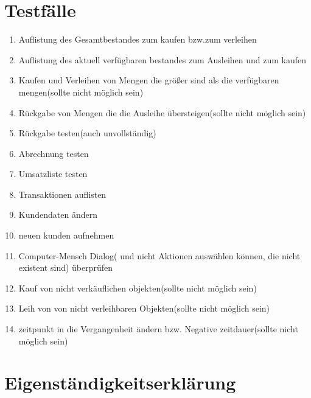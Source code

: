 \documentclass[a4paper,12pt]{book}
\begin{document}
\part{Testfälle}
\begin{enumerate}
\item
Auflistung des Gesamtbestandes zum kaufen bzw.zum verleihen 
\item
Auflistung des aktuell verfügbaren bestandes zum Ausleihen und zum kaufen
\item
Kaufen und Verleihen von Mengen die größer sind als die verfügbaren mengen(sollte nicht möglich sein)
\item
Rückgabe von Mengen die die Ausleihe übersteigen(sollte nicht möglich sein)
\item
Rückgabe testen(auch unvollständig)
\item
Abrechnung testen
\item
Umsatzliste testen
\item
Transaktionen auflisten
\item
Kundendaten ändern 
\item
neuen kunden aufnehmen
\item
Computer-Mensch Dialog( und nicht Aktionen auswählen können, die nicht existent sind) überprüfen
\item
Kauf von nicht verkäuflichen objekten(sollte nicht möglich sein)
\item
Leih von von nicht verleihbaren Objekten(sollte nicht möglich sein)
\item
zeitpunkt in die Vergangenheit ändern bzw. Negative zeitdauer(sollte nicht möglich sein)

\end{enumerate}
\appendix
\part{Eigenständigkeitserklärung}
\end{document}
